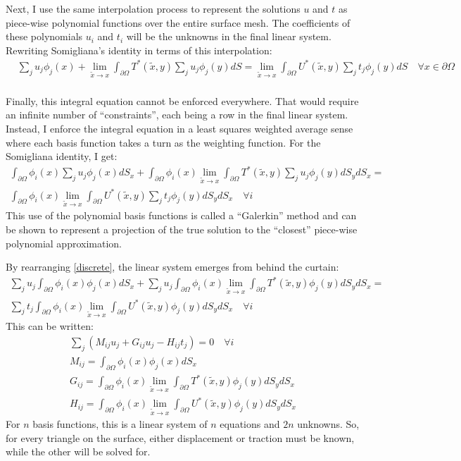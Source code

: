 \documentclass[a4paper]{article}
\newcommand{\pO}{\partial \Omega}
\begin{document}
Next, I use the same interpolation process to represent the solutions $u$ and $t$ as piece-wise polynomial functions over the entire surface mesh. The coefficients of these polynomials $u_i$ and $t_i$ will be the unknowns in the final linear system. Rewriting Somigliana's identity in terms of this interpolation:
\begin{align}
    &\displaystyle\sum_ju_j\phi_j(x) + \lim_{\tilde{x} \to x}\int_{\pO} T^*(\tilde{x}, y)\sum_ju_j\phi_j(y) dS = \lim_{\tilde{x} \to x}\int_{\pO} U^*(\tilde{x},y)\sum_jt_j\phi_j(y) dS \quad \forall x \in \pO\\
\end{align}

Finally, this integral equation cannot be enforced everywhere. That would require an infinite number of ``constraints'', each being a row in the final linear system. Instead, I enforce the integral equation in a least squares weighted average sense where each basis function takes a turn as the weighting function. For the Somigliana identity, I get:
\begin{multline}
    \int_{\pO}\phi_i(x)\displaystyle\sum_ju_j\phi_j(x)dS_x + \int_{\pO}\phi_i(x)\lim_{\tilde{x} \to x}\int_{\pO} T^*(\tilde{x}, y)\sum_ju_j\phi_j(y) dS_ydS_x = \\ 
    \int_{\pO}\phi_i(x)\lim_{\tilde{x} \to x}\int_{\pO} U^*(\tilde{x},y)\sum_jt_j\phi_j(y) dS_ydS_x \quad \forall i
    \label{discrete}
\end{multline}
This use of the polynomial basis functions is called a ``Galerkin'' method and can be shown to represent a projection of the true solution to the ``closest'' piece-wise polynomial approximation.

By rearranging \ref{discrete}, the linear system emerges from behind the curtain: 
\begin{multline}
    \displaystyle\sum_ju_j\int_{\pO}\phi_i(x)\phi_j(x)dS_x + \sum_ju_j\int_{\pO}\phi_i(x)\lim_{\tilde{x} \to x}\int_{\pO} T^*(\tilde{x}, y)\phi_j(y) dS_ydS_x = \\ 
    \sum_jt_j\int_{\pO}\phi_i(x)\lim_{\tilde{x} \to x}\int_{\pO} U^*(\tilde{x},y)\phi_j(y) dS_ydS_x \quad \forall i
\end{multline}
This can be written:
\begin{eqnarray}
    \sum_j(M_{ij}u_j + G_{ij}u_j - H_{ij}t_j) = 0 \quad \forall i\\
    M_{ij} = \int_{\pO}\phi_i(x)\phi_j(x)dS_x\\
    G_{ij} = \int_{\pO}\phi_i(x)\lim_{\tilde{x} \to x}\int_{\pO} T^*(\tilde{x}, y)\phi_j(y) dS_ydS_x\\
    H_{ij} = \int_{\pO}\phi_i(x)\lim_{\tilde{x} \to x}\int_{\pO} U^*(\tilde{x},y)\phi_j(y) dS_ydS_x
\end{eqnarray}
For $n$ basis functions, this is a linear system of $n$ equations and $2n$ unknowns. So, for every triangle on the surface, either displacement or traction must be known, while the other will be solved for.
\end{document}
